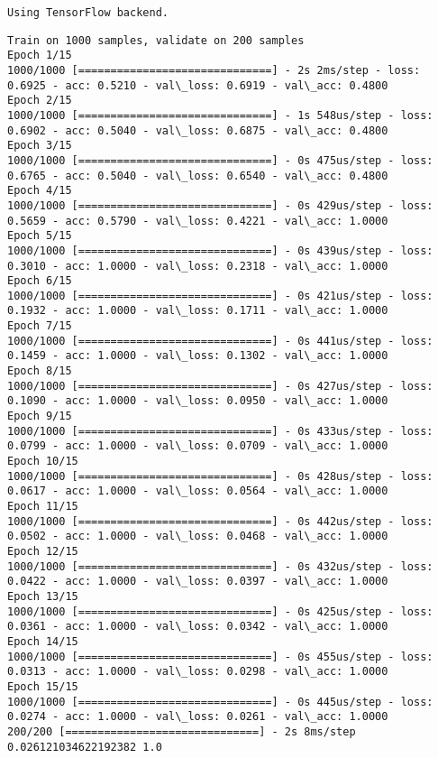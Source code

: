 \documentclass[11pt]{article}
\begin{document}
    \begin{Verbatim}[commandchars=\\\{\}]
Using TensorFlow backend.

    \end{Verbatim}

    \begin{Verbatim}[commandchars=\\\{\}]
Train on 1000 samples, validate on 200 samples
Epoch 1/15
1000/1000 [==============================] - 2s 2ms/step - loss: 0.6925 - acc: 0.5210 - val\_loss: 0.6919 - val\_acc: 0.4800
Epoch 2/15
1000/1000 [==============================] - 1s 548us/step - loss: 0.6902 - acc: 0.5040 - val\_loss: 0.6875 - val\_acc: 0.4800
Epoch 3/15
1000/1000 [==============================] - 0s 475us/step - loss: 0.6765 - acc: 0.5040 - val\_loss: 0.6540 - val\_acc: 0.4800
Epoch 4/15
1000/1000 [==============================] - 0s 429us/step - loss: 0.5659 - acc: 0.5790 - val\_loss: 0.4221 - val\_acc: 1.0000
Epoch 5/15
1000/1000 [==============================] - 0s 439us/step - loss: 0.3010 - acc: 1.0000 - val\_loss: 0.2318 - val\_acc: 1.0000
Epoch 6/15
1000/1000 [==============================] - 0s 421us/step - loss: 0.1932 - acc: 1.0000 - val\_loss: 0.1711 - val\_acc: 1.0000
Epoch 7/15
1000/1000 [==============================] - 0s 441us/step - loss: 0.1459 - acc: 1.0000 - val\_loss: 0.1302 - val\_acc: 1.0000
Epoch 8/15
1000/1000 [==============================] - 0s 427us/step - loss: 0.1090 - acc: 1.0000 - val\_loss: 0.0950 - val\_acc: 1.0000
Epoch 9/15
1000/1000 [==============================] - 0s 433us/step - loss: 0.0799 - acc: 1.0000 - val\_loss: 0.0709 - val\_acc: 1.0000
Epoch 10/15
1000/1000 [==============================] - 0s 428us/step - loss: 0.0617 - acc: 1.0000 - val\_loss: 0.0564 - val\_acc: 1.0000
Epoch 11/15
1000/1000 [==============================] - 0s 442us/step - loss: 0.0502 - acc: 1.0000 - val\_loss: 0.0468 - val\_acc: 1.0000
Epoch 12/15
1000/1000 [==============================] - 0s 432us/step - loss: 0.0422 - acc: 1.0000 - val\_loss: 0.0397 - val\_acc: 1.0000
Epoch 13/15
1000/1000 [==============================] - 0s 425us/step - loss: 0.0361 - acc: 1.0000 - val\_loss: 0.0342 - val\_acc: 1.0000
Epoch 14/15
1000/1000 [==============================] - 0s 455us/step - loss: 0.0313 - acc: 1.0000 - val\_loss: 0.0298 - val\_acc: 1.0000
Epoch 15/15
1000/1000 [==============================] - 0s 445us/step - loss: 0.0274 - acc: 1.0000 - val\_loss: 0.0261 - val\_acc: 1.0000
200/200 [==============================] - 2s 8ms/step
0.026121034622192382 1.0

    \end{Verbatim}
\end{document}
